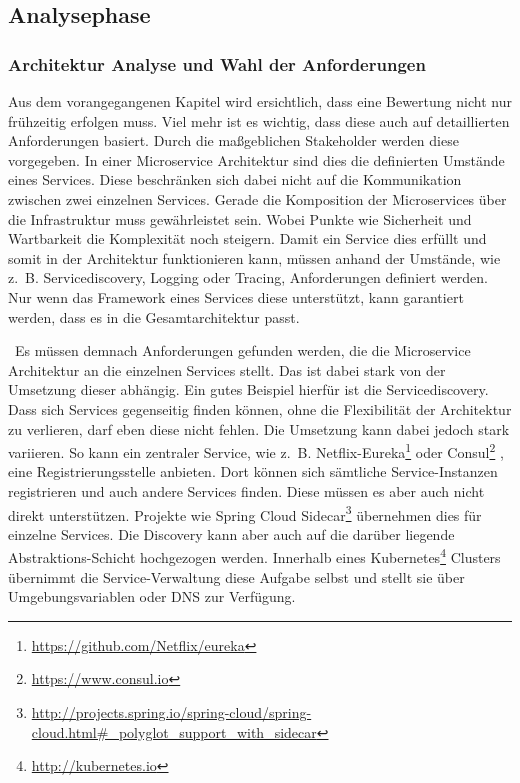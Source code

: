 \subsection{Analysephase}


\subsubsection{Architektur Analyse und Wahl der Anforderungen}\label{Analyse_Wahl_Anforderungen}

Aus dem vorangegangenen Kapitel wird ersichtlich, dass eine Bewertung nicht nur frühzeitig erfolgen muss. Viel mehr ist es wichtig, dass diese auch auf detaillierten Anforderungen basiert. Durch die maßgeblichen Stakeholder werden diese vorgegeben. In einer Microservice Architektur sind dies die definierten Umstände eines Services. Diese beschränken sich dabei nicht auf die Kommunikation zwischen zwei einzelnen Services. Gerade die Komposition der Microservices über die Infrastruktur muss gewährleistet sein. Wobei Punkte wie Sicherheit und Wartbarkeit die Komplexität noch steigern.
Damit ein Service dies erfüllt und somit in der Architektur funktionieren kann, müssen anhand der Umstände, wie z.~B. Servicediscovery, Logging oder Tracing, Anforderungen definiert werden. Nur wenn das Framework eines Services diese unterstützt, kann garantiert werden, dass es in die Gesamtarchitektur passt.

\
Es müssen demnach Anforderungen gefunden werden, die die Microservice Architektur an die einzelnen Services stellt. Das ist dabei stark von der Umsetzung dieser abhängig. Ein gutes Beispiel hierfür ist die Servicediscovery. Dass sich Services gegenseitig finden können, ohne die Flexibilität der Architektur zu verlieren, darf eben diese nicht fehlen. Die Umsetzung kann dabei jedoch stark variieren. So kann ein zentraler Service, wie z.~B. Netflix-Eureka\footnote{
\url{https://github.com/Netflix/eureka}
}
oder Consul\footnote{
\url{https://www.consul.io}
}
, eine Registrierungsstelle anbieten. Dort können sich sämtliche Service-Instanzen registrieren und auch andere Services finden. Diese müssen es aber auch nicht direkt unterstützen. Projekte wie Spring Cloud Sidecar\footnote{
\url{http://projects.spring.io/spring-cloud/spring-cloud.html\#_polyglot_support_with_sidecar}
}
übernehmen dies für einzelne Services. Die Discovery kann aber auch auf die darüber liegende Abstraktions-Schicht hochgezogen werden. Innerhalb eines Kubernetes\footnote{
\url{http://kubernetes.io}
}
Clusters übernimmt die Service-Verwaltung diese Aufgabe selbst und stellt sie über Umgebungsvariablen oder DNS zur Verfügung. 

